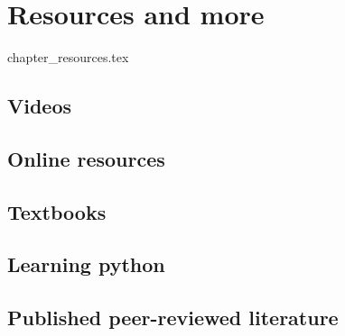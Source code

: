 \chapter{Resources and more}
\begin{flushright} {\tiny {\color{gray} chapter\_resources.tex}} \end{flushright}


\section{Videos}  %

\section{Online resources}  %

\section{Textbooks}  %

\section{Learning python}  %

\section{Published peer-reviewed literature}  %

